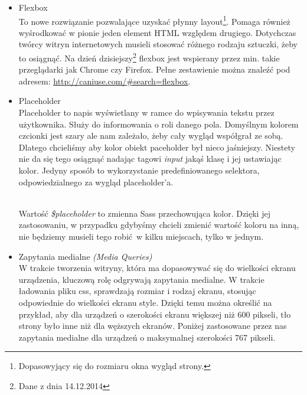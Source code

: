         \begin{itemize}
          \item Flexbox\\
            To nowe rozwiązanie pozwalające uzyskać płynny layout\footnote{Dopasowyjący się do rozmiaru okna wygląd strony.}. Pomaga również wyśrodkować w pionie jeden element HTML względem drugiego. Dotychczas twórcy witryn internetowych musieli stosować różnego rodzaju sztuczki, żeby to osiągnąć. Na dzień dzisiejszy\footnote{Dane z dnia 14.12.2014} flexbox jest wspierany przez min. takie przeglądarki jak Chrome czy Firefox. Pełne zestawienie można znaleźć pod adresem: \url{http://caniuse.com/\#search=flexbox}. \\
            

          \item Placeholder\\
            Placeholder to napis wyświetlany w ramce do wpisywania tekstu przez użytkownika. Służy do informowania o roli danego pola. Domyślnym kolorem czcionki jest szary ale nam zależało, żeby cały wygląd współgrał ze sobą. Dlatego chcieliśmy aby kolor obiekt paceholder był nieco jaśniejszy. Niestety nie da się tego osiągnąć nadając tagowi \emph{input} jakąś klasę i jej ustawiając kolor. Jedyny sposób to wykorzystanie predefiniowanego selektora, odpowiedzialnego za wygląd placeholder'a.

            \begin{code}
              
            \end{code}\\

            Wartość \emph{\$placeholder} to zmienna Sass przechowująca kolor. Dzięki jej zastosowaniu, w przypadku gdybyśmy chcieli zmienić wartość koloru na inną, nie będziemy musieli tego robić w kilku miejscach, tylko w jednym.

          \item Zapytania medialne \emph{(Media Queries)}\\ 
            W trakcie tworzenia witryny, która ma dopasowywać się do wielkości ekranu urządzenia, kluczową rolę odgrywają zapytania medialne. W trakcie ładowania pliku css, sprawdzają rozmiar i rodzaj ekranu, stosując odpowiednie do wielkości ekranu style. Dzięki temu można określić na przykład, aby dla urządzeń o szerokości ekranu większej niż 600 pikseli, tło strony było inne niż dla węższych ekranów.
            Poniżej zastosowane przez nas zapytania medialne dla urządzeń o maksymalnej szerokości 767 pikseli.
            \begin{code}
              
            \end{code}
        \end{itemize}
